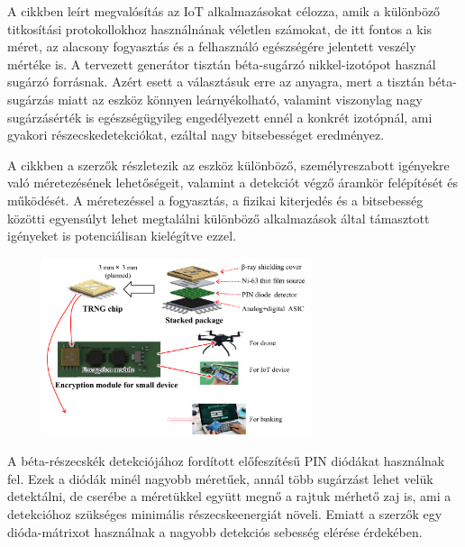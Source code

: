 \documentclass[12pt,a4paper,oneside]{article}
\begin{document}
A cikkben leírt megvalósítás az IoT alkalmazásokat célozza, amik a különböző titkosítási protokollokhoz használnának véletlen számokat, de itt fontos a kis méret, az alacsony fogyasztás és a felhasználó egészségére jelentett veszély mértéke is. A tervezett generátor tisztán béta-sugárzó nikkel-izotópot használ sugárzó forrásnak. Azért esett a választásuk erre az anyagra, mert a tisztán béta-sugárzás miatt az eszköz könnyen leárnyékolható, valamint viszonylag nagy sugárzásérték is egészségügyileg engedélyezett ennél a konkrét izotópnál, ami gyakori részecskedetekciókat, ezáltal nagy bitsebességet eredményez.
\par
A cikkben a szerzők részletezik az eszköz különböző, személyreszabott igényekre való méretezésének lehetőségeit, valamint a detekciót végző áramkör felépítését és működését. A méretezéssel a fogyasztás, a fizikai kiterjedés és a bitsebesség közötti egyensúlyt lehet megtalálni különböző alkalmazások által támasztott igényeket is potenciálisan kielégítve ezzel.
\par
\begin{figure}[h!]
	\centering
	\includegraphics[width=0.7\textwidth]{beta2.png}
\end{figure}
A béta-részecskék detekciójához fordított előfeszítésű PIN diódákat használnak fel. Ezek a diódák minél nagyobb méretűek, annál több sugárzást lehet velük detektálni, de cserébe a méretükkel együtt megnő a rajtuk mérhető zaj is, ami a detekcióhoz szükséges minimális részecskeenergiát növeli. Emiatt a szerzők egy dióda-mátrixot használnak a nagyobb detekciós sebesség elérése érdekében.
\par
\end{document}
